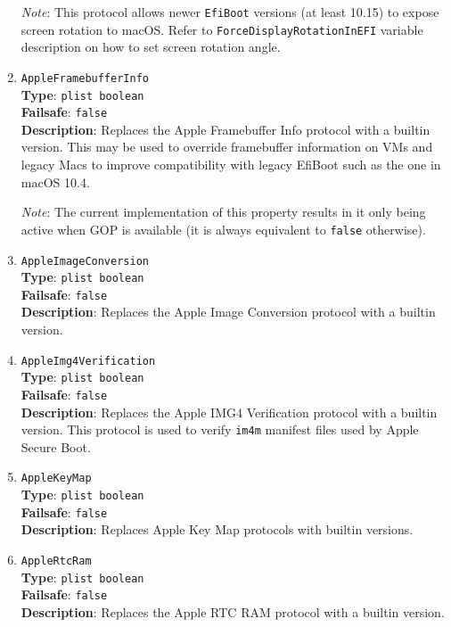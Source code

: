 \documentclass[]{article}
\begin{document}
\begin{enumerate}
  \emph{Note}: This protocol allows newer \texttt{EfiBoot} versions (at least 10.15)
  to expose screen rotation to macOS. Refer to \texttt{ForceDisplayRotationInEFI}
  variable description on how to set screen rotation angle.

\item
  \texttt{AppleFramebufferInfo}\\
  \textbf{Type}: \texttt{plist\ boolean}\\
  \textbf{Failsafe}: \texttt{false}\\
  \textbf{Description}: Replaces the Apple Framebuffer Info protocol with a builtin
  version. This may be used to override framebuffer information on VMs and legacy Macs
  to improve compatibility with legacy EfiBoot such as the one in macOS 10.4.

  \emph{Note}: The current implementation of this property results in it only being
  active when GOP is available (it is always equivalent to \texttt{false} otherwise).

\item
  \texttt{AppleImageConversion}\\
  \textbf{Type}: \texttt{plist\ boolean}\\
  \textbf{Failsafe}: \texttt{false}\\
  \textbf{Description}: Replaces the Apple Image Conversion protocol with a builtin
  version.

\item
  \texttt{AppleImg4Verification}\\
  \textbf{Type}: \texttt{plist\ boolean}\\
  \textbf{Failsafe}: \texttt{false}\\
  \textbf{Description}: Replaces the Apple IMG4 Verification protocol with a builtin
  version. This protocol is used to verify \texttt{im4m} manifest files used by
  Apple Secure Boot.

\item
  \texttt{AppleKeyMap}\\
  \textbf{Type}: \texttt{plist\ boolean}\\
  \textbf{Failsafe}: \texttt{false}\\
  \textbf{Description}: Replaces Apple Key Map protocols with builtin
  versions.

\item
  \texttt{AppleRtcRam}\\
  \textbf{Type}: \texttt{plist\ boolean}\\
  \textbf{Failsafe}: \texttt{false}\\
  \textbf{Description}: Replaces the Apple RTC RAM protocol with a builtin
  version.


\end{enumerate}
\end{document}
